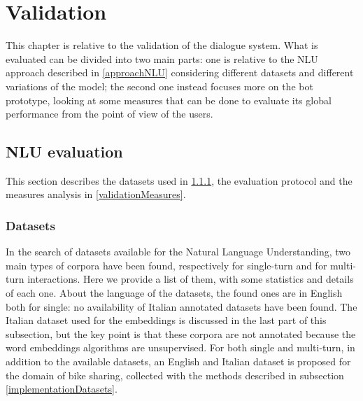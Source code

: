 


\chapter{Validation}
\label{validation}

This chapter is relative to the validation of the dialogue system. What is evaluated can be divided into two main parts: one is relative to the NLU approach described in \ref{approachNLU} considering different datasets and different variations of the model; the second one instead focuses more on the bot prototype, looking at some measures that can be done to evaluate its global performance from the point of view of the users.

\section{NLU evaluation}
\label{validationNLU}

This section  describes the datasets used in \ref{validationDatasets}, the evaluation protocol and the measures analysis in \ref{validationMeasures}.

\subsection{Datasets}
\label{validationDatasets}

In the search of datasets available for the Natural Language Understanding, two main types of corpora have been found, respectively for single-turn and for multi-turn interactions. Here we provide a list of them, with some statistics and details of each one. About the language of the datasets, the found ones are in English both for single: no availability of Italian annotated datasets have been found. The Italian dataset used for the embeddings is discussed in the last part of this subsection, but the key point is that these corpora are not annotated because the word embeddings algorithms are unsupervised. For both single and multi-turn, in addition to the available datasets, an English and Italian dataset is proposed for the domain of bike sharing, collected with the methods described in subsection \ref{implementationDatasets}.

